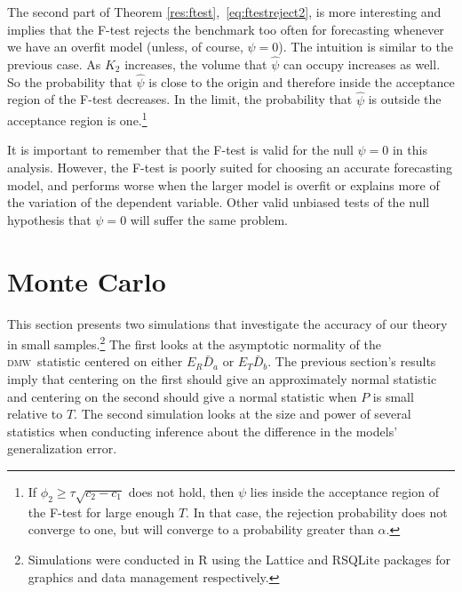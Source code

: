 \documentclass[11pt]{article}
\newcommand{\oosA}{\bar{D}_a}
\newcommand{\oosB}{\bar{D}_b}
\newcommand{\dmw}{\textsc{dmw}}
\begin{document}
The second part of Theorem \ref{res:ftest},~\eqref{eq:ftestreject2},
is more interesting and implies that the F-test rejects the benchmark
too often for forecasting whenever we have an overfit model (unless,
of course, $\psi = 0$).  The intuition is similar to the previous
case.  As $K_2$ increases, the volume that $\hat{\psi}$ can occupy
increases as well.  So the probability that $\hat{\psi}$ is close to
the origin and therefore inside the acceptance region of the F-test
decreases.  In the limit, the probability that $\hat{\psi}$ is outside
the acceptance region is one.\footnote{If $\phi_2 \geq \tau \sqrt{c_2
    - c_1}$ does not hold, then $\psi$ lies inside the acceptance
  region of the F-test for large enough $T$.  In that case, the
  rejection probability does not converge to one, but will converge to
  a probability greater than $\alpha$.}

It is important to remember that the F-test is valid for the null
$\psi = 0$ in this analysis.  However, the F-test is poorly suited for
choosing an accurate forecasting model, and performs worse when the
larger model is overfit or explains more of the variation of the
dependent variable.  Other valid unbiased tests of the null hypothesis
that $\psi = 0$ will suffer the same problem.

\section{Monte Carlo}\label{sec:mc}
\newcommand{\thetanorm}{\ensuremath{\lvert \theta \rvert_2}} This
section presents two simulations that investigate the accuracy of our
theory in small samples.\footnote{Simulations were conducted in R
  \citep{Rde:10} using the Lattice \citep{Sar:10} and RSQLite
  \citep{Jam:10} packages for graphics and data management
  respectively.}  The first looks at the asymptotic normality of the
\dmw\ statistic centered on either $E_R \oosA$ or $E_T \oosB$.
The previous section's results imply that centering on the first
should give an approximately normal statistic and centering on the
second should give a normal statistic when $P$ is small relative to
$T$.  The second simulation looks at the size and power of several
statistics when conducting inference about the difference in the
models' generalization error.
\end{document}
